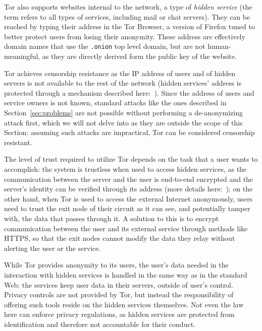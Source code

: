 \documentclass[mscthesis]{usiinfthesis}
\begin{document}
Tor also supports websites internal to the network, a type of \emph{hidden service} (the term refers to all types of services, including mail or chat servers). They can be reached by typing their address in the Tor Browser, a version of Firefox tuned to better protect users from losing their anonymity. These address are effectively domain names that use the \texttt{.onion} top level domain, but are not human-meaningful, as they are directly derived form the public key of the website.

Tor achieves censorship resistance as the IP address of users and of hidden servers is not available to the rest of the network (hidden services' address is protected through a mechanism described here:~\cite{website:torhiddenservice}). Since the address of users and service owners is not known, standard attacks like the ones described in Section~\ref{sec:problems} are not possible without performing a de-anonymizing attack first, which we will not delve into as they are outside the scope of this Section: assuming such attacks are impractical, Tor can be considered censorship resistant. %

The level of trust required to utilize Tor depends on the task that a user wants to accomplish: the system is trustless when used to access hidden services, as the communication between the server and the user is end-to-end encrypted and the server's identity can be verified through its address (more details here:~\cite{website:torhiddenservice}); on the other hand, when Tor is used to access the external Internet anonymously, users need to trust the exit node of their circuit as it can see, and potentially tamper with, the data that passes through it. A solution to this is to encrypt communication between the user and its external service through methods like HTTPS, so that the exit nodes cannot modify the data they relay without alerting the user or the service.

While Tor provides anonymity to its users, the user's data needed in the interaction with hidden services is handled in the same way as in the standard Web: the services keep user data in their servers, outside of user's control. Privacy controls are not provided by Tor, but instead the responsibility of offering such tools reside on the hidden services themselves. Not even the law here can enforce privacy regulations, as hidden services are protected from identification and therefore not accountable for their conduct.
\end{document}

